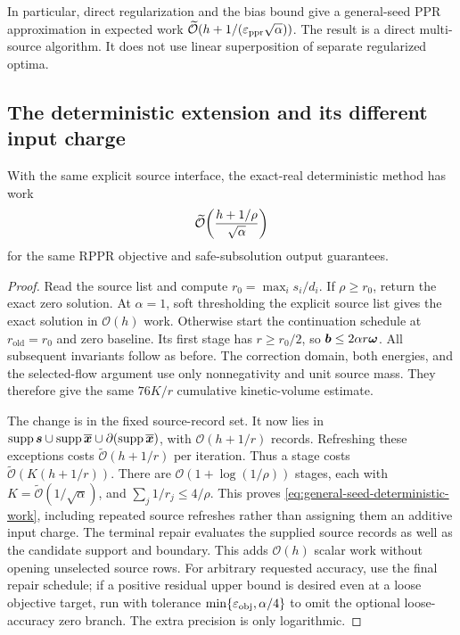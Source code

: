 In particular, direct regularization and the bias bound give a general-seed
PPR approximation in expected work
$\widetilde{\mathcal{O}}(h+1/(\varepsilon_{\mathrm{ppr}}\sqrt\alpha))$.
The result is a direct multi-source algorithm. It does not use linear
superposition of separate regularized optima.

\subsection{The deterministic extension and its different input charge}

\begin{proposition}
\label{prop:general-seed-deterministic}
With the same explicit source interface, the exact-real deterministic
method has work
\begin{equation}
 \widetilde{\mathcal{O}}\!\left(\frac{h+1/\rho}{\sqrt\alpha}\right)
 \label{eq:general-seed-deterministic-work}
\end{equation}
for the same RPPR objective and safe-subsolution output guarantees.
\end{proposition}
\begin{proof}
Read the source list and compute
$r_0=\max_i s_i/d_i$. If $\rho\geq r_0$, return the exact zero
solution. At $\alpha=1$, soft thresholding the explicit source list gives
the exact solution in $\mathcal{O}(h)$ work. Otherwise start the continuation schedule
at $r_{\mathrm{old}}=r_0$ and zero baseline. Its first stage has $r\geq r_0/2$, so
$\bm{b}\leq2\alpha r\bm{\omega}$. All subsequent invariants follow as before.
The correction domain, both energies, and the selected-flow argument use
only nonnegativity and unit source mass. They therefore give the same
$76K/r$ cumulative kinetic-volume estimate.

The change is in the fixed source-record set. It now lies in
$\operatorname{supp}\bm{s}\cup\operatorname{supp}\overline{\bm{x}}\cup\partial(\operatorname{supp}\overline{\bm{x}})$,
with $\mathcal{O}(h+1/r)$ records. Refreshing these exceptions costs
$\widetilde{\mathcal{O}}(h+1/r)$ per iteration. Thus a stage costs
$\widetilde{\mathcal{O}}(K(h+1/r))$.
There are $\mathcal{O}(1+\log(1/\rho))$ stages, each with
$K=\widetilde{\mathcal{O}}(1/\sqrt\alpha)$, and
$\sum_j1/r_j\leq4/\rho$. This proves
\cref{eq:general-seed-deterministic-work}, including repeated source
refreshes rather than assigning them an additive input charge.
The terminal repair evaluates the supplied source records as well as the
candidate support and boundary. This adds $\mathcal{O}(h)$ scalar work without
opening unselected source rows.
For arbitrary requested accuracy, use the final repair schedule; if a
positive residual upper bound is desired even at a loose objective target,
run with tolerance $\min\{\varepsilon_{\mathrm{obj}},\alpha/4\}$ to omit the optional
loose-accuracy zero branch. The extra precision is only logarithmic.
\end{proof}

